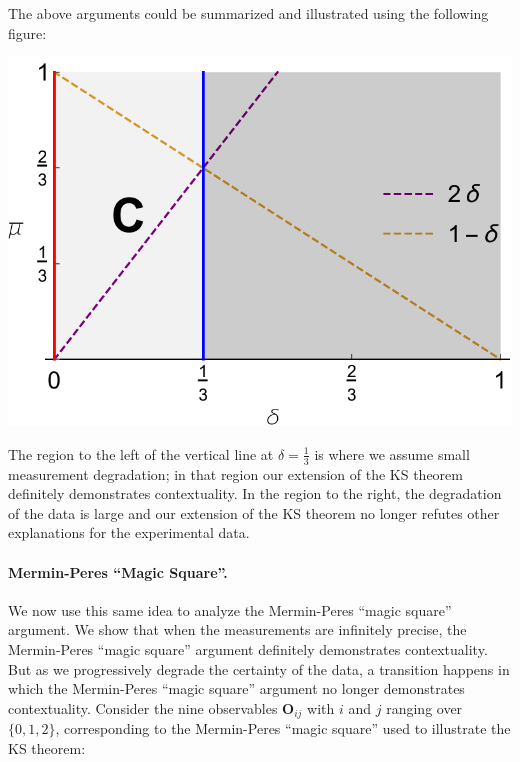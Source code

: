 \documentclass[english,reprint, aps, prl,superscriptaddress, showpacs,
showkeys, longbibliography, amsmath, amssymb, floatfix]{revtex4-1}
\theoremstyle{plain}
\theoremstyle{definition}
\begin{document}
The above arguments could be summarized and illustrated using the following figure: 
\begin{center}
\includegraphics[scale=0.5]{prop_letter_ajhs_referee_response_nb}
\par\end{center}

\noindent The region to the left of the vertical line at
$\delta=\frac{1}{3}$ is where we assume small measurement degradation;
in that region our extension of the KS theorem definitely demonstrates
contextuality. In the region to the right, the degradation of the data
is large and our extension of the KS theorem no longer refutes other
explanations for the experimental data.

\bigskip

\paragraph*{Mermin-Peres ``Magic Square''.} We now use this same idea
to analyze the Mermin-Peres ``magic square'' argument. We show that
when the measurements are infinitely precise, the Mermin-Peres ``magic
square'' argument definitely demonstrates contextuality. But as we
progressively degrade the certainty of the data, a transition happens
in which the Mermin-Peres ``magic square'' argument no longer
demonstrates contextuality. Consider the nine observables
$\mathbf{O}_{ij}$ with $i$ and $j$ ranging over $\{0,1,2\}$,
corresponding to the Mermin-Peres ``magic square'' used to illustrate the
KS theorem:
\end{document}
